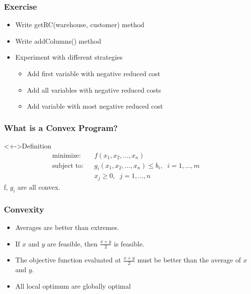 \documentclass[12pt,handout]{beamer}
\begin{document}
\begin{frame}
  \frametitle{Exercise}
  \begin{itemize}
    \item Write getRC(warehouse, customer) method
    \item Write addColumns() method
    \item Experiment with different strategies
      \begin{itemize}
        \item Add first variable with negative reduced cost
        \item Add all variables with negative reduced costs
        \item Add variable with most negative reduced cost
      \end{itemize}
  \end{itemize}
\end{frame}


\begin{frame}
\frametitle{What is a Convex Program?}
\begin{block}<+->{Definition}
\begin{eqnarray}
\mbox{minimize:} && f(x_1, x_2, \ldots, x_n) \nonumber \\
\mbox{subject to:} && g_i(x_1, x_2, \ldots, x_n) \le b_i, \;\; i = 1, \ldots, m \nonumber \\
&& x_j \ge 0,\;\;j = 1, \ldots, n \nonumber
\end{eqnarray}
f, $g_i$ are all convex.
\end{block}
\end{frame}

\begin{frame}
  \frametitle{Convexity}
  \begin{itemize}
    \item Averages are better than extremes.
    \item If $x$ and $y$ are feasible, then $\frac{x + y}{2}$ is feasible.
    \item The objective function evaluated at $\frac{x + y}{2}$ must be better than the average of $x$ and $y$. \\
\item All local optimum are globally optimal
  \end{itemize}
\end{frame}
\end{document}
